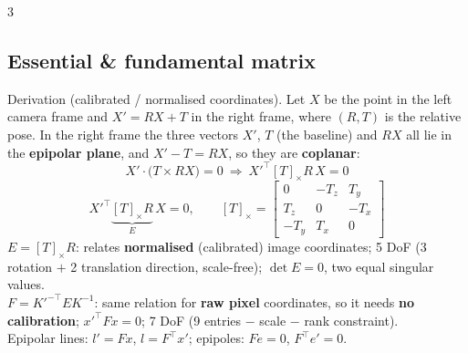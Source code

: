 \documentclass[9pt,a4paper,landscape]{extarticle}
\newcommand{\key}[1]{\textbf{#1}}
\begin{document}
\begin{multicols}{3}
\subsection{Essential \& fundamental matrix}
Derivation (calibrated / normalised coordinates). Let $X$ be the point in the left camera frame and $X'=RX+T$ in the right frame, where $(R,T)$ is the relative pose. In the right frame the three vectors $X'$, $T$ (the baseline) and $RX$ all lie in the \key{epipolar plane}, and $X'-T=RX$, so they are \key{coplanar}:
$$X'\cdot\big(T\times RX\big)=0\ \Longrightarrow\ X'^{\top}[T]_\times R\,X=0$$
$$X'^{\top}\underbrace{[T]_\times R}_{E}\,X=0,\qquad
[T]_\times=\begin{bmatrix}0&-T_z&T_y\\ T_z&0&-T_x\\ -T_y&T_x&0\end{bmatrix}$$
\key{$E=[T]_\times R$}: relates \key{normalised} (calibrated) image coordinates; 5 DoF (3 rotation $+$ 2 translation direction, scale-free); $\det E=0$, two equal singular values.\\
\key{$F=K'^{-\top}EK^{-1}$}: same relation for \key{raw pixel} coordinates, so it needs \key{no calibration}; $x'^\top F x=0$; 7 DoF (9 entries $-$ scale $-$ rank constraint).\\
Epipolar lines: $l'=Fx$, $l=F^\top x'$; epipoles: $Fe=0$, $F^\top e'=0$.


\end{multicols}
\end{document}
